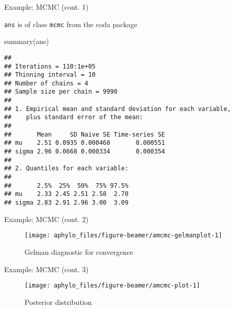 \documentclass[9pt,ignorenonframetext,]{beamer}
\newenvironment{Shaded}{\begin{snugshade}}{\end{snugshade}}
\newcommand{\KeywordTok}[1]{\textcolor[rgb]{0.94,0.87,0.69}{#1}}
\newcommand{\NormalTok}[1]{\textcolor[rgb]{0.80,0.80,0.80}{#1}}
\begin{document}
\begin{frame}[fragile,t]{Example: MCMC (cont. 1)}

\texttt{ans} is of class \texttt{mcmc} from the coda package

\footnotesize

\begin{Shaded}
\begin{Highlighting}[]
\KeywordTok{summary}\NormalTok{(ans)}
\end{Highlighting}
\end{Shaded}

\begin{verbatim}
## 
## Iterations = 110:1e+05
## Thinning interval = 10 
## Number of chains = 4 
## Sample size per chain = 9990 
## 
## 1. Empirical mean and standard deviation for each variable,
##    plus standard error of the mean:
## 
##       Mean     SD Naive SE Time-series SE
## mu    2.51 0.0935 0.000468       0.000551
## sigma 2.96 0.0668 0.000334       0.000354
## 
## 2. Quantiles for each variable:
## 
##       2.5%  25%  50%  75% 97.5%
## mu    2.33 2.45 2.51 2.58  2.70
## sigma 2.83 2.91 2.96 3.00  3.09
\end{verbatim}

\normalsize

\end{frame}

\begin{frame}[t]{Example: MCMC (cont. 2)}

\footnotesize

\begin{figure}

{\centering \texttt{[image: aphylo\_files/figure-beamer/amcmc-gelmanplot-1]} 

}

\caption{Gelman diagnostic for convergence}\label{fig:amcmc-gelmanplot}
\end{figure}

\normalsize

\end{frame}

\begin{frame}[t]{Example: MCMC (cont. 3)}

\footnotesize

\begin{figure}

{\centering \texttt{[image: aphylo\_files/figure-beamer/amcmc-plot-1]} 

}

\caption{Posterior distribution}\label{fig:amcmc-plot}
\end{figure}

\normalsize

\end{frame}
\end{document}
